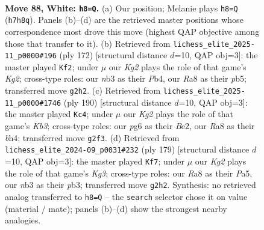 \documentclass[11pt]{article}
\begin{document}
\clearpage

\begin{figure}[p]\centering
\begin{subfigure}{0.46\textwidth}\centering
\resizebox{\linewidth}{!}{%
\newchessgame
\chessboard[
  setfen={R7/7P/4k1p1/5p2/5P2/1n6/6K1/8 w - - 9 88},
  showmover=false,
  pgfstyle=straightmove, color=movearrow, markmove={h7-h8}
]}
\caption{}
\end{subfigure}\hfill
\begin{subfigure}{0.46\textwidth}\centering
\resizebox{\linewidth}{!}{%
\newchessgame
\chessboard[
  setfen={8/8/5k2/1p2p1p1/1P2P1P1/8/6K1/8 w - - 10 87},
  showmover=false,
  pgfstyle=straightmove, color=movearrow, markmove={g2-f2}
]}
\caption{}
\end{subfigure}
\\[4pt]
\begin{subfigure}{0.46\textwidth}\centering
\resizebox{\linewidth}{!}{%
\newchessgame
\chessboard[
  setfen={8/kp6/3P4/2P5/5p1b/1K6/4B3/8 w - - 7 96},
  showmover=false,
  pgfstyle=straightmove, color=movearrow, markmove={b3-c4}
]}
\caption{}
\end{subfigure}\hfill
\begin{subfigure}{0.46\textwidth}\centering
\resizebox{\linewidth}{!}{%
\newchessgame
\chessboard[
  setfen={8/8/1pp3k1/p3P3/2P2K2/1P6/8/8 b - - 4 90},
  showmover=false,
  pgfstyle=straightmove, color=movearrow, markmove={g6-f7}
]}
\caption{}
\end{subfigure}
\caption{\textbf{Move 88, White: \texttt{h8=Q}.} (a) Our position; Melanie plays \texttt{h8=Q} (\texttt{h7h8q}). Panels (b)--(d) are the retrieved master positions whose correspondence most drove this move (highest QAP objective among those that transfer to it). (b) Retrieved from \texttt{lichess\_elite\_2025-11\_p0000\#196} (ply 172) [structural distance $d$=10, QAP obj=3]: the master played \texttt{Kf2}; under $\mu$ our \emph{Kg2} plays the role of that game's \emph{Kg2}; cross-type roles: our \emph{n}b3 as their \emph{P}b4, our \emph{R}a8 as their \emph{p}b5; transferred move \texttt{g2h2}. (c) Retrieved from \texttt{lichess\_elite\_2025-11\_p0000\#1746} (ply 190) [structural distance $d$=10, QAP obj=3]: the master played \texttt{Kc4}; under $\mu$ our \emph{Kg2} plays the role of that game's \emph{Kb3}; cross-type roles: our \emph{p}g6 as their \emph{B}e2, our \emph{R}a8 as their \emph{b}h4; transferred move \texttt{g2f3}. (d) Retrieved from \texttt{lichess\_elite\_2024-09\_p0031\#232} (ply 179) [structural distance $d$=10, QAP obj=3]: the master played \texttt{Kf7}; under $\mu$ our \emph{Kg2} plays the role of that game's \emph{Kg3}; cross-type roles: our \emph{R}a8 as their \emph{P}a5, our \emph{n}b3 as their \emph{p}b3; transferred move \texttt{g2h2}. Synthesis: no retrieved analog transferred to \texttt{h8=Q} -- the \texttt{search} selector chose it on value (material / mate); panels (b)--(d) show the strongest nearby analogies.}
\label{fig:thought-m174}
\end{figure}
\end{document}
